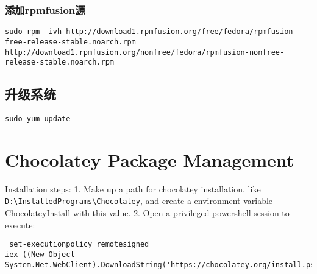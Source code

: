 \subsubsection{添加rpmfusion源}
\begin{lstlisting}
sudo rpm -ivh http://download1.rpmfusion.org/free/fedora/rpmfusion-free-release-stable.noarch.rpm 
http://download1.rpmfusion.org/nonfree/fedora/rpmfusion-nonfree-release-stable.noarch.rpm
\end{lstlisting}

\subsection{升级系统}
\begin{lstlisting}
sudo yum update
\end{lstlisting}



\section{Chocolatey Package Management}

Installation steps:
1. Make up a path for chocolatey installation, like
\verb$D:\InstalledPrograms\Chocolatey$, and create a environment variable
ChocolateyInstall with this value.
2. Open a privileged powershell session to execute:
\begin{verbatim}
 set-executionpolicy remotesigned
iex ((New-Object System.Net.WebClient).DownloadString('https://chocolatey.org/install.ps1'))
\end{verbatim}
















